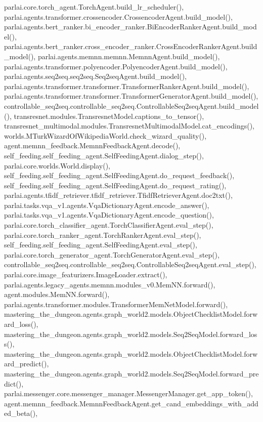 parlai.\+core.\+torch\+\_\+agent.\+Torch\+Agent.\+build\+\_\+lr\+\_\+scheduler(), parlai.\+agents.\+transformer.\+crossencoder.\+Crossencoder\+Agent.\+build\+\_\+model(), parlai.\+agents.\+bert\+\_\+ranker.\+bi\+\_\+encoder\+\_\+ranker.\+Bi\+Encoder\+Ranker\+Agent.\+build\+\_\+model(), parlai.\+agents.\+bert\+\_\+ranker.\+cross\+\_\+encoder\+\_\+ranker.\+Cross\+Encoder\+Ranker\+Agent.\+build\+\_\+model(), parlai.\+agents.\+memnn.\+memnn.\+Memnn\+Agent.\+build\+\_\+model(), parlai.\+agents.\+transformer.\+polyencoder.\+Polyencoder\+Agent.\+build\+\_\+model(), parlai.\+agents.\+seq2seq.\+seq2seq.\+Seq2seq\+Agent.\+build\+\_\+model(), parlai.\+agents.\+transformer.\+transformer.\+Transformer\+Ranker\+Agent.\+build\+\_\+model(), parlai.\+agents.\+transformer.\+transformer.\+Transformer\+Generator\+Agent.\+build\+\_\+model(), controllable\+\_\+seq2seq.\+controllable\+\_\+seq2seq.\+Controllable\+Seq2seq\+Agent.\+build\+\_\+model(), transresnet.\+modules.\+Transresnet\+Model.\+captions\+\_\+to\+\_\+tensor(), transresnet\+\_\+multimodal.\+modules.\+Transresnet\+Multimodal\+Model.\+cat\+\_\+encodings(), worlds.\+M\+Turk\+Wizard\+Of\+Wikipedia\+World.\+check\+\_\+wizard\+\_\+quality(), agent.\+memnn\+\_\+feedback.\+Memnn\+Feedback\+Agent.\+decode(), self\+\_\+feeding.\+self\+\_\+feeding\+\_\+agent.\+Self\+Feeding\+Agent.\+dialog\+\_\+step(), parlai.\+core.\+worlds.\+World.\+display(), self\+\_\+feeding.\+self\+\_\+feeding\+\_\+agent.\+Self\+Feeding\+Agent.\+do\+\_\+request\+\_\+feedback(), self\+\_\+feeding.\+self\+\_\+feeding\+\_\+agent.\+Self\+Feeding\+Agent.\+do\+\_\+request\+\_\+rating(), parlai.\+agents.\+tfidf\+\_\+retriever.\+tfidf\+\_\+retriever.\+Tfidf\+Retriever\+Agent.\+doc2txt(), parlai.\+tasks.\+vqa\+\_\+v1.\+agents.\+Vqa\+Dictionary\+Agent.\+encode\+\_\+answer(), parlai.\+tasks.\+vqa\+\_\+v1.\+agents.\+Vqa\+Dictionary\+Agent.\+encode\+\_\+question(), parlai.\+core.\+torch\+\_\+classifier\+\_\+agent.\+Torch\+Classifier\+Agent.\+eval\+\_\+step(), parlai.\+core.\+torch\+\_\+ranker\+\_\+agent.\+Torch\+Ranker\+Agent.\+eval\+\_\+step(), self\+\_\+feeding.\+self\+\_\+feeding\+\_\+agent.\+Self\+Feeding\+Agent.\+eval\+\_\+step(), parlai.\+core.\+torch\+\_\+generator\+\_\+agent.\+Torch\+Generator\+Agent.\+eval\+\_\+step(), controllable\+\_\+seq2seq.\+controllable\+\_\+seq2seq.\+Controllable\+Seq2seq\+Agent.\+eval\+\_\+step(), parlai.\+core.\+image\+\_\+featurizers.\+Image\+Loader.\+extract(), parlai.\+agents.\+legacy\+\_\+agents.\+memnn.\+modules\+\_\+v0.\+Mem\+N\+N.\+forward(), agent.\+modules.\+Mem\+N\+N.\+forward(), parlai.\+agents.\+transformer.\+modules.\+Transformer\+Mem\+Net\+Model.\+forward(), mastering\+\_\+the\+\_\+dungeon.\+agents.\+graph\+\_\+world2.\+models.\+Object\+Checklist\+Model.\+forward\+\_\+loss(), mastering\+\_\+the\+\_\+dungeon.\+agents.\+graph\+\_\+world2.\+models.\+Seq2\+Seq\+Model.\+forward\+\_\+loss(), mastering\+\_\+the\+\_\+dungeon.\+agents.\+graph\+\_\+world2.\+models.\+Object\+Checklist\+Model.\+forward\+\_\+predict(), mastering\+\_\+the\+\_\+dungeon.\+agents.\+graph\+\_\+world2.\+models.\+Seq2\+Seq\+Model.\+forward\+\_\+predict(), parlai.\+messenger.\+core.\+messenger\+\_\+manager.\+Messenger\+Manager.\+get\+\_\+app\+\_\+token(), agent.\+memnn\+\_\+feedback.\+Memnn\+Feedback\+Agent.\+get\+\_\+cand\+\_\+embeddings\+\_\+with\+\_\+added\+\_\+beta(), 